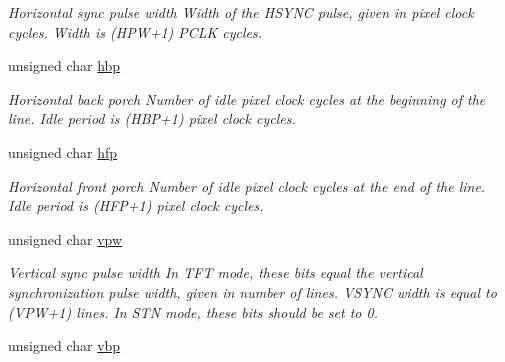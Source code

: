\begin{CompactItemize}
\begin{CompactList}\small\item\em Horizontal sync pulse width Width of the HSYNC pulse, given in pixel clock cycles. Width is (HPW+1) PCLK cycles. \item\end{CompactList}\item 
\hypertarget{structlcdc__configuration__s_316da3ed91db5048ede48e62b6be77f7}{
unsigned char \hyperlink{structlcdc__configuration__s_316da3ed91db5048ede48e62b6be77f7}{hbp}}
\label{structlcdc__configuration__s_316da3ed91db5048ede48e62b6be77f7}

\begin{CompactList}\small\item\em Horizontal back porch Number of idle pixel clock cycles at the beginning of the line. Idle period is (HBP+1) pixel clock cycles. \item\end{CompactList}\item 
\hypertarget{structlcdc__configuration__s_f3e2bf84cec7907050560a4568e67583}{
unsigned char \hyperlink{structlcdc__configuration__s_f3e2bf84cec7907050560a4568e67583}{hfp}}
\label{structlcdc__configuration__s_f3e2bf84cec7907050560a4568e67583}

\begin{CompactList}\small\item\em Horizontal front porch Number of idle pixel clock cycles at the end of the line. Idle period is (HFP+1) pixel clock cycles. \item\end{CompactList}\item 
\hypertarget{structlcdc__configuration__s_56d7dd5b0140e43cb113636b07fbf846}{
unsigned char \hyperlink{structlcdc__configuration__s_56d7dd5b0140e43cb113636b07fbf846}{vpw}}
\label{structlcdc__configuration__s_56d7dd5b0140e43cb113636b07fbf846}

\begin{CompactList}\small\item\em Vertical sync pulse width In TFT mode, these bits equal the vertical synchronization pulse width, given in number of lines. VSYNC width is equal to (VPW+1) lines. In STN mode, these bits should be set to 0. \item\end{CompactList}\item 
\hypertarget{structlcdc__configuration__s_151f01d6514e8dc399e1a68112ffeca2}{
unsigned char \hyperlink{structlcdc__configuration__s_151f01d6514e8dc399e1a68112ffeca2}{vbp}}
\label{structlcdc__configuration__s_151f01d6514e8dc399e1a68112ffeca2}


\end{CompactItemize}
